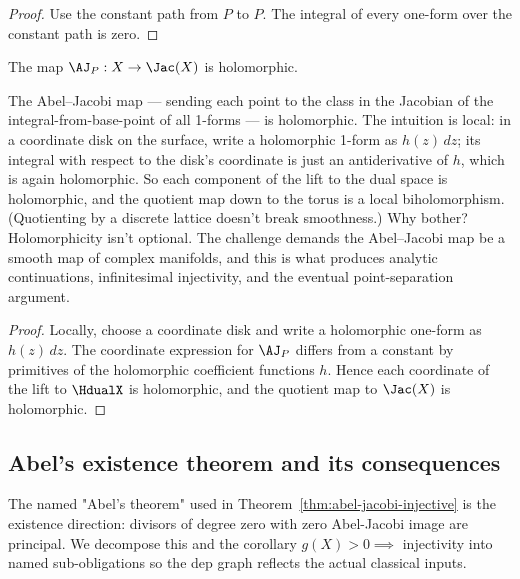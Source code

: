 \begin{proof}
\leanok
Use the constant path from \(P\) to \(P\). The integral of every one-form over
the constant path is zero.
\end{proof}

\begin{lemma}
\label{lem:aj-holomorphic}
The map \(\AJ_P:X\to\Jac(X)\) is holomorphic.
\leanok
\end{lemma}

\begin{layman}
The Abel--Jacobi map --- sending each point to the class in the Jacobian
of the integral-from-base-point of all 1-forms --- is holomorphic. The
intuition is local: in a coordinate disk on the surface, write a
holomorphic 1-form as \(h(z)\,dz\); its integral with respect to the
disk's coordinate is just an antiderivative of \(h\), which is again
holomorphic. So each component of the lift to the dual space is
holomorphic, and the quotient map down to the torus is a local
biholomorphism. (Quotienting by a discrete lattice doesn't break
smoothness.) Why bother? Holomorphicity isn't optional. The challenge
demands the Abel--Jacobi map be a smooth map of complex manifolds, and
this is what produces analytic continuations, infinitesimal injectivity,
and the eventual point-separation argument.
\end{layman}

\begin{proof}
\leanok
Locally, choose a coordinate disk and write a holomorphic one-form as
\(h(z)\,dz\). The coordinate expression for \(\AJ_P\) differs from a constant
by primitives of the holomorphic coefficient functions \(h\). Hence each
coordinate of the lift to \(\HdualX\) is holomorphic, and the quotient map to
\(\Jac(X)\) is holomorphic.
\end{proof}

\subsection{Abel's existence theorem and its consequences}

The named "Abel's theorem" used in
Theorem~\ref{thm:abel-jacobi-injective} is the existence direction:
divisors of degree zero with zero Abel-Jacobi image are principal. We
decompose this and the corollary \(g(X)>0 \implies\) injectivity into named
sub-obligations so the dep graph reflects the actual classical inputs.


